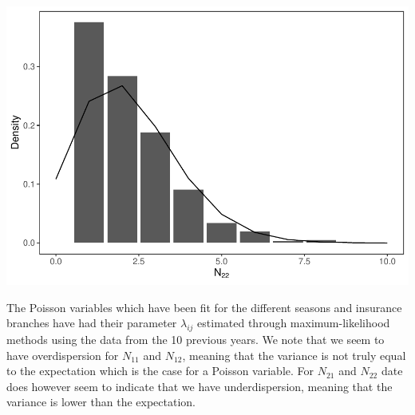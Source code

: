 \documentclass[]{article}
\begin{document}
\includegraphics{Projekt1_files/figure-latex/unnamed-chunk-4-4.pdf}

The Poisson variables which have been fit for the different seasons and
insurance branches have had their parameter \(\lambda_{ij}\) estimated
through maximum-likelihood methods using the data from the 10 previous
years. We note that we seem to have overdispersion for \(N_{11}\) and
\(N_{12}\), meaning that the variance is not truly equal to the
expectation which is the case for a Poisson variable. For \(N_{21}\) and
\(N_{22}\) date does however seem to indicate that we have
underdispersion, meaning that the variance is lower than the
expectation.
\end{document}
